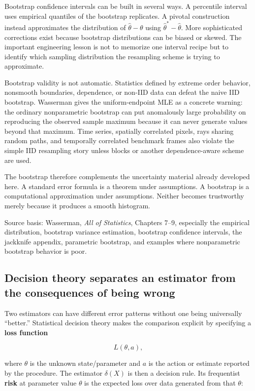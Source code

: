 Bootstrap confidence intervals can be built in several ways. A percentile interval uses empirical quantiles of the bootstrap replicates. A pivotal construction instead approximates the distribution of \(\hat\theta-\theta\) using \(\hat\theta^*-\hat\theta\). More sophisticated corrections exist because bootstrap distributions can be biased or skewed. The important engineering lesson is not to memorize one interval recipe but to identify which sampling distribution the resampling scheme is trying to approximate.

Bootstrap validity is not automatic. Statistics defined by extreme order behavior, nonsmooth boundaries, dependence, or non-IID data can defeat the naive IID bootstrap. Wasserman gives the uniform-endpoint MLE as a concrete warning: the ordinary nonparametric bootstrap can put anomalously large probability on reproducing the observed sample maximum because it can never generate values beyond that maximum. Time series, spatially correlated pixels, rays sharing random paths, and temporally correlated benchmark frames also violate the simple IID resampling story unless blocks or another dependence-aware scheme are used.

The bootstrap therefore complements the uncertainty material already developed here. A standard error formula is a theorem under assumptions. A bootstrap is a computational approximation under assumptions. Neither becomes trustworthy merely because it produces a smooth histogram.

Source basis: Wasserman, \emph{All of Statistics}, Chapters 7--9, especially the empirical distribution, bootstrap variance estimation, bootstrap confidence intervals, the jackknife appendix, parametric bootstrap, and examples where nonparametric bootstrap behavior is poor.

\subsection{Decision theory separates an estimator from the consequences of being wrong}\label{02-foundations-ii-ch030-decision-theory-separates-an-estimator-from-the-consequences-of-being-wrong}

Two estimators can have different error patterns without one being universally ``better.'' Statistical decision theory makes the comparison explicit by specifying a \textbf{loss function}

\[
L(\theta,a),
\]

where \(\theta\) is the unknown state/parameter and \(a\) is the action or estimate reported by the procedure. The estimator \(\delta(X)\) is then a decision rule. Its frequentist \textbf{risk} at parameter value \(\theta\) is the expected loss over data generated from that \(\theta\):

